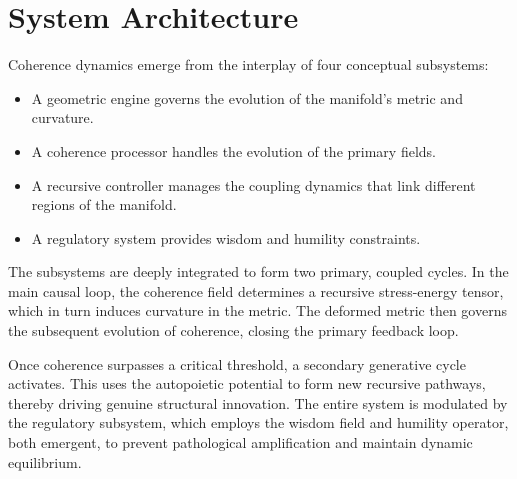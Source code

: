 



\section{System Architecture}
\label{2.3:system_architecture}

Coherence dynamics emerge from the interplay of four conceptual subsystems:

\begin{itemize}

    \item A geometric engine governs the evolution of the manifold's metric and curvature.

    \item A coherence processor handles the evolution of the primary fields.

    \item A recursive controller manages the coupling dynamics that link different regions of the manifold.

    \item A regulatory system provides wisdom and humility constraints.

\end{itemize}

The subsystems are deeply integrated to form two primary, coupled cycles. In the main causal loop, the coherence field determines a recursive stress-energy tensor, which in turn induces curvature in the metric. The deformed metric then governs the subsequent evolution of coherence, closing the primary feedback loop. 

Once coherence surpasses a critical threshold, a secondary generative cycle activates. This uses the autopoietic potential to form new recursive pathways, thereby driving genuine structural innovation. The entire system is modulated by the regulatory subsystem, which employs the wisdom field and humility operator, both emergent, to prevent pathological amplification and maintain dynamic equilibrium.

